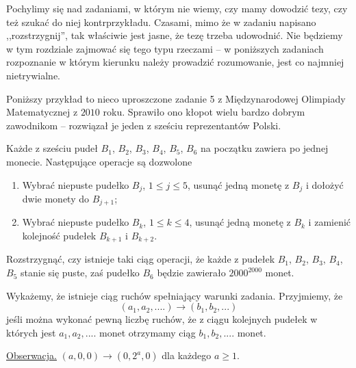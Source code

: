 

\noindent
Pochylimy się nad zadaniami, w którym nie wiemy, czy mamy dowodzić tezy, czy też szukać do niej kontrprzykładu. Czasami, mimo że w zadaniu napisano ,,rozstrzygnij'', tak właściwie jest jasne, że tezę trzeba udowodnić. Nie będziemy w tym rozdziale zajmować się tego typu rzeczami -- w poniższych zadaniach rozpoznanie w którym kierunku należy prowadzić rozumowanie, jest co najmniej nietrywialne.

\vspace{10px}
\noindent
Poniższy przykład to nieco uproszczone zadanie 5 z Międzynarodowej Olimpiady Matematycznej z $2010$ roku. Sprawiło ono kłopot wielu bardzo dobrym zawodnikom -- rozwiązał je jeden z sześciu reprezentantów Polski.


\noindent
Każde z sześciu pudeł $B_1$, $B_2$, $B_3$, $B_4$, $B_5$, $B_6$ na początku zawiera po jednej monecie. Następujące operacje są dozwolone

\begin{enumerate}
	\item Wybrać niepuste pudełko $B_j$, $1\leq j \leq 5$, usunąć jedną monetę z $B_j$ i dołożyć dwie monety do $B_{j + 1}$;

	\item  Wybrać niepuste pudełko $B_k$, $1\leq k \leq 4$, usunąć jedną monetę z $B_k$ i zamienić kolejność pudełek $B_{k+1}$ i $B_{k+2}$.

\end{enumerate}

\noindent
Rozstrzygnąć, czy istnieje taki ciąg operacji, że każde z pudełek $B_1$, $B_2$, $B_3$, $B_4$, $B_5$ stanie się puste, zaś pudełko $B_6$ będzie zawierało $2000^{2000}$ monet.

\vspace{5px}


\noindent
Wykażemy, że istnieje ciąg ruchów spełniający warunki zadania. Przyjmiemy, że 
\[
	(a_1, a_2, ....) \rightarrow (b_1, b_2, ...)
\] 
jeśli można wykonać pewną liczbę ruchów, że z ciągu kolejnych pudełek w których jest $a_1, a_2, ....$ monet otrzymamy ciąg $b_1, b_2, ....$ monet.

\vspace{10px}

\noindent
\underline{Obserwacja.} $(a, 0, 0) \rightarrow (0, 2^a, 0)$ dla każdego $a \geqslant 1.$

